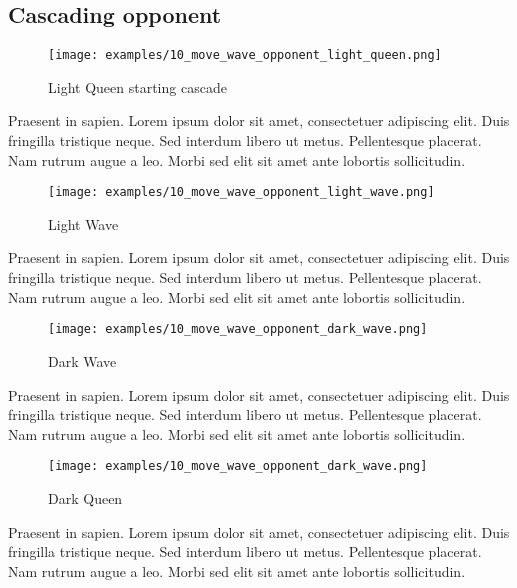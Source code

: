 \clearpage %

\subsection*{Cascading opponent}

\noindent
\begin{wrapfigure}[10]{l}{0.5625\textwidth}
\texttt{[image: examples/10\_move\_wave\_opponent\_light\_queen.png]}
\caption{Light Queen starting cascade}
\label{fig:10_move_wave_opponent_light_queen}
\end{wrapfigure}
Praesent in sapien. Lorem ipsum dolor sit amet, consectetuer adipiscing elit.
Duis fringilla tristique neque. Sed interdum libero ut metus. Pellentesque placerat.
Nam rutrum augue a leo. Morbi sed elit sit amet ante lobortis sollicitudin.

\vspace*{0.175\textheight}
\noindent
\begin{wrapfigure}[10]{r}{0.5625\textwidth}
\texttt{[image: examples/10\_move\_wave\_opponent\_light\_wave.png]}
\caption{Light Wave}
\label{fig:10_move_wave_opponent_light_wave}
\end{wrapfigure}
Praesent in sapien. Lorem ipsum dolor sit amet, consectetuer adipiscing elit.
Duis fringilla tristique neque. Sed interdum libero ut metus. Pellentesque placerat.
Nam rutrum augue a leo. Morbi sed elit sit amet ante lobortis sollicitudin.

\clearpage %

\noindent
\begin{wrapfigure}[10]{l}{0.5625\textwidth}
\texttt{[image: examples/10\_move\_wave\_opponent\_dark\_wave.png]}
\caption{Dark Wave}
\label{fig:10_move_wave_opponent_dark_wave}
\end{wrapfigure}
Praesent in sapien. Lorem ipsum dolor sit amet, consectetuer adipiscing elit.
Duis fringilla tristique neque. Sed interdum libero ut metus. Pellentesque placerat.
Nam rutrum augue a leo. Morbi sed elit sit amet ante lobortis sollicitudin.

\vspace*{0.175\textheight}
\noindent
\begin{wrapfigure}[10]{r}{0.5625\textwidth}
\texttt{[image: examples/10\_move\_wave\_opponent\_dark\_wave.png]}
\caption{Dark Queen}
\label{fig:10_move_wave_opponent_dark_queen}
\end{wrapfigure}
Praesent in sapien. Lorem ipsum dolor sit amet, consectetuer adipiscing elit.
Duis fringilla tristique neque. Sed interdum libero ut metus. Pellentesque placerat.
Nam rutrum augue a leo. Morbi sed elit sit amet ante lobortis sollicitudin.


